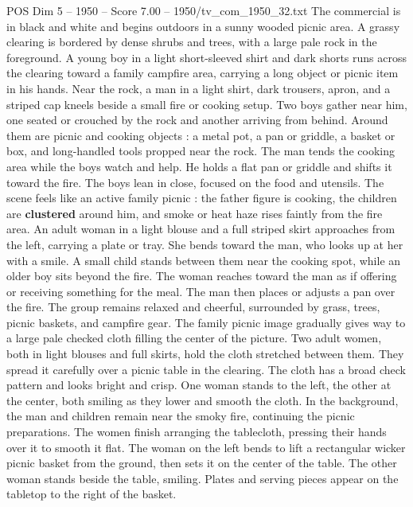 \begin{textsample}{POS Dim 5 – 1950 – Score 7.00 – 1950/tv\_com\_1950\_32.txt}  \label{ex:f5_pos_074}
The commercial is in black and white and begins outdoors in a sunny wooded picnic area.
A grassy clearing is bordered by dense shrubs and trees, with a large pale rock in the foreground.
A young boy in a light short-sleeved shirt and dark shorts runs across the clearing toward a family campfire area, carrying a long object or picnic item in his hands.
Near the rock, a man in a light shirt, dark trousers, apron, and a striped cap kneels beside a small fire or cooking setup.
Two boys gather near him, one seated or crouched by the rock and another arriving from behind.
Around them are picnic and cooking objects : a metal pot, a pan or griddle, a basket or box, and long-handled tools propped near the rock.
The man tends the cooking area while the boys watch and help.
He holds a flat pan or griddle and shifts it toward the fire.
The boys lean in close, focused on the food and utensils.
The scene feels like an active family picnic : the father figure is cooking, the children are \textbf{clustered} around him, and smoke or heat haze rises faintly from the fire area.
An adult woman in a light blouse and a full striped skirt approaches from the left, carrying a plate or tray.
She bends toward the man, who looks up at her with a smile.
A small child stands between them near the cooking spot, while an older boy sits beyond the fire.
The woman reaches toward the man as if offering or receiving something for the meal.
The man then places or adjusts a pan over the fire.
The group remains relaxed and cheerful, surrounded by grass, trees, picnic baskets, and campfire gear.
The family picnic image gradually gives way to a large pale checked cloth filling the center of the picture.
Two adult women, both in light blouses and full skirts, hold the cloth stretched between them.
They spread it carefully over a picnic table in the clearing.
The cloth has a broad check pattern and looks bright and crisp.
One woman stands to the left, the other at the center, both smiling as they lower and smooth the cloth.
In the background, the man and children remain near the smoky fire, continuing the picnic preparations.
The women finish arranging the tablecloth, pressing their hands over it to smooth it flat.
The woman on the left bends to lift a rectangular wicker picnic basket from the ground, then sets it on the center of the table.
The other woman stands beside the table, smiling.
Plates and serving pieces appear on the tabletop to the right of the basket.

\end{textsample}
